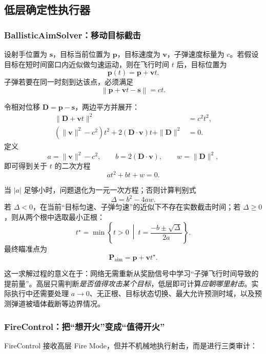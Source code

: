 \documentclass[UTF8,a4paper,11pt]{ctexart}
\begin{document}
\subsection{低层确定性执行器}

\subsubsection{BallisticAimSolver：移动目标截击}
设射手位置为 $\bm s$，目标当前位置为 $\bm p$，目标速度为 $\bm v$，子弹速度标量为 $c$。若假设目标在短时间窗口内近似做匀速运动，则在飞行时间 $t$ 后，目标位置为
\[
\bm p(t)=\bm p+\bm v t.
\]
子弹若要在同一时刻到达该点，必须满足
\begin{equation}
    \left\|\bm p+\bm v t-\bm s\right\|=ct.
\end{equation}

令相对位移 $\bm D=\bm p-\bm s$，两边平方并展开：
\begin{align}
    \|\bm D+\bm v t\|^2 &= c^2t^2,\\
    (\|\bm v\|^2-c^2)t^2
    +2(\bm D\cdot\bm v)t
    +\|\bm D\|^2 &= 0.
\end{align}
定义
\begin{equation}
    a=\|\bm v\|^2-c^2,\qquad
    b=2(\bm D\cdot\bm v),\qquad
    w=\|\bm D\|^2,
\end{equation}
即可得到关于 $t$ 的二次方程
\begin{equation}
    at^2+bt+w=0.
\end{equation}

当 $|a|$ 足够小时，问题退化为一元一次方程；否则计算判别式
\begin{equation}
    \Delta=b^2-4aw.
\end{equation}
若 $\Delta<0$，在当前“目标匀速、子弹匀速”的近似下不存在实数截击时间；若 $\Delta\ge0$，则从两个根中选取最小正根：
\begin{equation}
    t^\star=
    \min\left\{
    t>0\ \middle|\
    t=\frac{-b\pm\sqrt{\Delta}}{2a}
    \right\}.
\end{equation}
最终瞄准点为
\begin{equation}
    \bm P_{\mathrm{aim}}=\bm p+\bm v t^\star.
\end{equation}

这一求解过程的意义在于：网络无需重新从奖励信号中学习“子弹飞行时间导致的提前量”。高层只需判断\emph{是否值得攻击某个目标}，低层即可计算\emph{应朝哪里射击}。实际执行中还需要处理 $a\rightarrow0$、无正根、目标状态切换、最大允许预测时域，以及预测弹道被墙体截断等边界情况。

\subsubsection{FireControl：把“想开火”变成“值得开火”}
FireControl 接收高层 Fire Mode，但并不机械地执行射击，而是进行三类审计：
\end{document}
